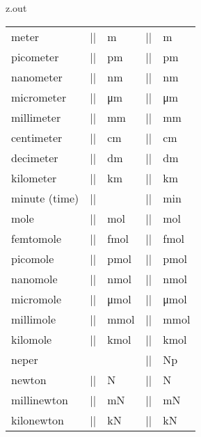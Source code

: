 \begin{VerbatimOut}{z.out}
{\begin{longtable}{@{}lllll@{}}
    meter&                |\m|&    \unit{\m}&    |\meter|&              \unit{\meter}\\
    \q picometer&         |\pm|&   \unit{\pm}&   |\pico\meter|&         \unit{\pico\meter}\\
    \q nanometer&         |\nm|&   \unit{\nm}&   |\nano\meter|&         \unit{\nano\meter}\\
    \q micrometer&        |\um|&   \unit{\um}&   |\micro\meter|&        \unit{\micro\meter}\\
    \q millimeter&        |\mm|&   \unit{\mm}&   |\milli\meter|&        \unit{\milli\meter}\\
    \q centimeter&        |\cm|&   \unit{\cm}&   |\centi\meter|&        \unit{\centi\meter}\\
    \q decimeter&         |\dm|&   \unit{\dm}&   |\deci\meter|&         \unit{\deci\meter}\\
    \q kilometer&         |\km|&   \unit{\km}&   |\kilo\meter|&         \unit{\kilo\meter}\\[6pt]
    minute (time)&        |\min|&  \unit{\min}&  |\minute|&             \unit{\minute}\\[6pt]
    mole&                 |\mol|&  \unit{\mol}&  |\mole|&               \unit{\mole}\\
    \q femtomole&         |\fmol|& \unit{\fmol}& |\femto\mole|&         \unit{\femto\mole}\\
    \q picomole&          |\pmol|& \unit{\pmol}& |\pico\mole|&          \unit{\pico\mole}\\
    \q nanomole&          |\nmol|& \unit{\nmol}& |\nano\mole|&          \unit{\nano\mole}\\
    \q micromole&         |\umol|& \unit{\umol}& |\micro\mole|&         \unit{\micro\mole}\\
    \q millimole&         |\mmol|& \unit{\mmol}& |\milli\mole|&         \unit{\milli\mole}\\
    \q kilomole&          |\kmol|& \unit{\kmol}& |\kilo\mole|&          \unit{\kilo\mole}\\[6pt]
    neper&                &        &             |\neper|&              \unit{\neper}\\[6pt]
    newton&               |\N|&    \unit{\N}&    |\newton|&             \unit{\newton}\\
    \q millinewton&       |\mN|&   \unit{\mN}&   |\milli\newton|&       \unit{\milli\newton}\\
    \q kilonewton&        |\kN|&   \unit{\kN}&   |\kilo\newton|&        \unit{\kilo\newton}\\

\end{longtable}}
\end{VerbatimOut}
